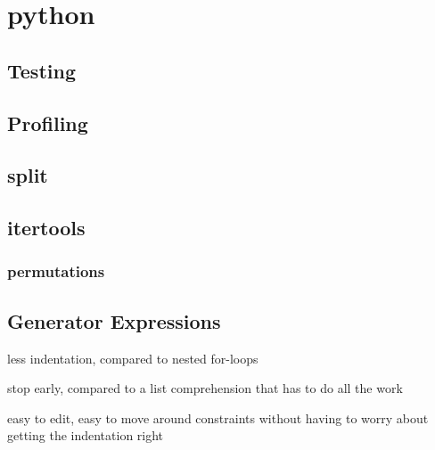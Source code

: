 \documentclass[12pt]{article}
\begin{document}
\maketitle

\section{python}

\subsection{Testing}
\scriptsize


\subsection{Profiling}


\subsection{split}


\subsection{itertools}

\subsubsection{permutations}


\subsection{Generator Expressions}

\begin{list}{*}{
\setlength{\itemsep}{0pt}
\setlength{\parsep}{0pt}
\setlength{\topsep}{0pt}
\setlength{\partopsep}{0pt}
\setlength{\leftmargin}{2em}
\setlength{\labelwidth}{1.5em}
\setlength{\labelsep}{0.5em}
}
\item less indentation, compared to nested for-loops
\item stop early, compared to a list comprehension that has to do all the work
\item easy to edit, easy to move around constraints without having to worry about getting the indentation right
\end{list}
\end{document}
